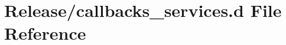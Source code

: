\hypertarget{callbacks__services_8d}{}\section{Release/callbacks\+\_\+services.d File Reference}
\label{callbacks__services_8d}
